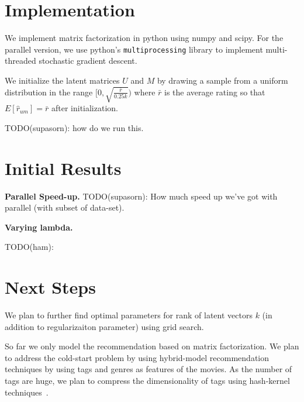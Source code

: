 \documentclass{article} %
\begin{document}
\section{Implementation}

We implement matrix factorization in python using numpy and scipy.
For the parallel version, we use python's \texttt{multiprocessing} library to implement multi-threaded stochastic gradient descent.

We initialize the latent matrices $U$ and $M$ by drawing a sample from a uniform distribution in the range $[0,\sqrt{\frac{\bar{r}}{0.25k}})$ where $\bar{r}$ is the average rating so that $E[\hat{r}_{um}] = \bar{r}$ after initialization.

TODO(supasorn): how do we run this.

\section{Initial Results}

\textbf{Parallel Speed-up.}
TODO(supasorn): How much speed up we've got with parallel (with subset of data-set).

\textbf{Varying lambda.}

TODO(ham):


\section{Next Steps}

We plan to further find optimal parameters for rank of latent vectors $k$
(in addition to regularizaiton parameter) using grid search.

So far we only model the recommendation based on matrix factorization.
We plan to address the cold-start problem by using hybrid-model recommendation techniques by using tags and genres as features of the movies.
As the number of tags are huge, we plan to compress the dimensionality of tags using hash-kernel techniques~\cite{shi:hashkernels}.








{}
\end{document}
